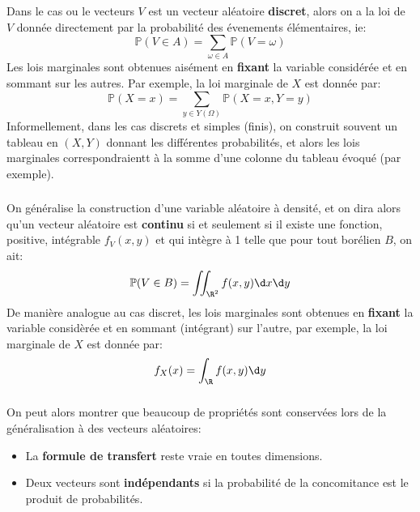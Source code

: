 \subsection*{}
Dans le cas ou le vecteurs \(V\) est un vecteur aléatoire \textbf{discret}, alors on a la loi de \(V\) donnée directement par la probabilité des évenements élémentaires, ie:
\[
   \mathbb{P}(V \in A) = \sum_{\omega \in A} \mathbb{P}(V = \omega)
\]
Les lois marginales sont obtenues aisément en \textbf{fixant} la variable considérée et en sommant sur les autres. Par exemple, la loi marginale de \(X\) est donnée par:
\[
   \mathbb{P}(X = x) = \sum_{y \in Y(\Omega)} \mathbb{P}(X = x, Y = y)
\]
Informellement, dans les cas discrets et simples (finis), on construit souvent un tableau en \((X, Y)\) donnant les différentes probabilités, et alors les lois marginales correspondraientt à la somme d'une colonne du tableau évoqué (par exemple).

\subsection*{}
On généralise la construction d'une variable aléatoire à densité, et on dira alors qu'un vecteur aléatoire est \textbf{continu} si et seulement si il existe une fonction, positive, intégrable \(f_V(x, y)\) et qui intègre à 1 telle que pour tout borélien \(B\), on ait:
\[
   \mathbb{P}(V \in B) = \iint_{\R^2} f(x,y)  \d x \d y
\]
De manière analogue au cas discret, les lois marginales sont obtenues en \textbf{fixant} la variable considèrée et en sommant (intégrant) sur l'autre, par exemple, la loi marginale de \(X\) est donnée par:
\[
   f_X(x) = \int_{\R} f(x,y) \d y
\]

\subsection*{}
On peut alors montrer que beaucoup de propriétés sont conservées lors de la généralisation à des vecteurs aléatoires:
\begin{itemize}
   \item La \textbf{formule de transfert} reste vraie en toutes dimensions.
   \item Deux vecteurs sont \textbf{indépendants} si la probabilité de la concomitance est le produit de probabilités.
\end{itemize}
\chapter*{} %

